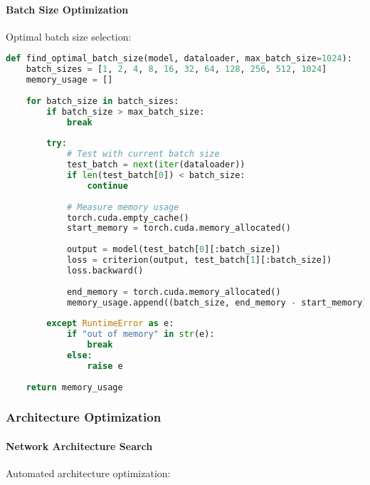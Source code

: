 \paragraph{Batch Size Optimization}
Optimal batch size selection:

\begin{lstlisting}[language=python, caption=Batch Size Optimization]
def find_optimal_batch_size(model, dataloader, max_batch_size=1024):
    batch_sizes = [1, 2, 4, 8, 16, 32, 64, 128, 256, 512, 1024]
    memory_usage = []
    
    for batch_size in batch_sizes:
        if batch_size > max_batch_size:
            break
            
        try:
            # Test with current batch size
            test_batch = next(iter(dataloader))
            if len(test_batch[0]) < batch_size:
                continue
                
            # Measure memory usage
            torch.cuda.empty_cache()
            start_memory = torch.cuda.memory_allocated()
            
            output = model(test_batch[0][:batch_size])
            loss = criterion(output, test_batch[1][:batch_size])
            loss.backward()
            
            end_memory = torch.cuda.memory_allocated()
            memory_usage.append((batch_size, end_memory - start_memory))
            
        except RuntimeError as e:
            if "out of memory" in str(e):
                break
            else:
                raise e
    
    return memory_usage
\end{lstlisting}

\subsubsection{Architecture Optimization}

\paragraph{Network Architecture Search}
Automated architecture optimization:

